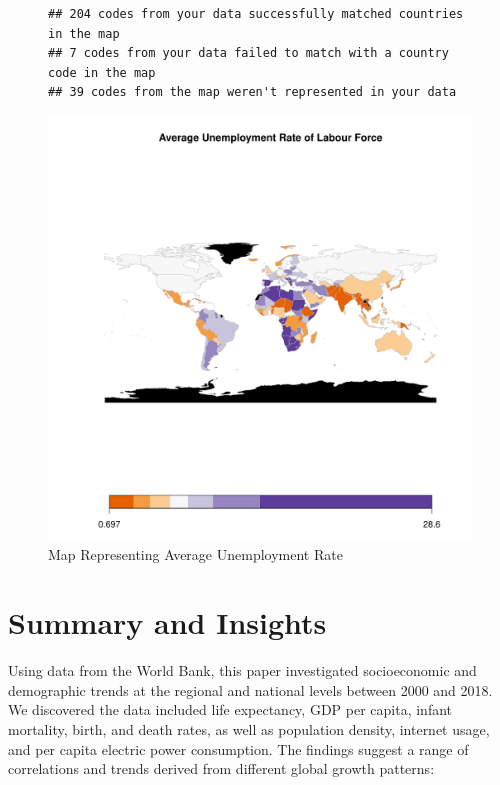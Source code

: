 \documentclass{article}\usepackage[]{graphicx}\usepackage[]{xcolor}
\makeatletter
\def\maxwidth{ %
  \ifdim\Gin@nat@width>\linewidth
    \linewidth
  \else
    \Gin@nat@width
  \fi
}
\newenvironment{kframe}{%
 \def\at@end@of@kframe{}%
 \ifinner\ifhmode%
  \def\at@end@of@kframe{\end{minipage}}%
  \begin{minipage}{\columnwidth}%
 \fi\fi%
 \def\FrameCommand##1{\hskip\@totalleftmargin \hskip-\fboxsep
 \colorbox{shadecolor}{##1}\hskip-\fboxsep
     \hskip-\linewidth \hskip-\@totalleftmargin \hskip\columnwidth}%
 \MakeFramed {\advance\hsize-\width
   \@totalleftmargin\z@ \linewidth\hsize
   \@setminipage}}%
 {\par\unskip\endMakeFramed%
 \at@end@of@kframe}
\newenvironment{knitrout}{}{} %
\makeatother
\begin{document}
\begin{figure}[h!]
\centering
\begin{knitrout}
\color{fgcolor}\begin{kframe}
\begin{verbatim}
## 204 codes from your data successfully matched countries in the map
## 7 codes from your data failed to match with a country code in the map
## 39 codes from the map weren't represented in your data
\end{verbatim}
\end{kframe}
\includegraphics[width=\maxwidth]{figure/unnamed-chunk-25-1} 
\end{knitrout}
\caption{Map Representing Average Unemployment Rate}

\label{fig}
\end{figure}

\newpage
\section{Summary and Insights}
Using data from the World Bank, this paper investigated socioeconomic and demographic trends at the regional and national levels between 2000 and 2018. We discovered the data included life expectancy, GDP per capita, infant mortality, birth, and death rates, as well as population density, internet usage, and per capita electric power consumption. The findings suggest a range of correlations and trends derived from different global growth patterns:
\end{document}
